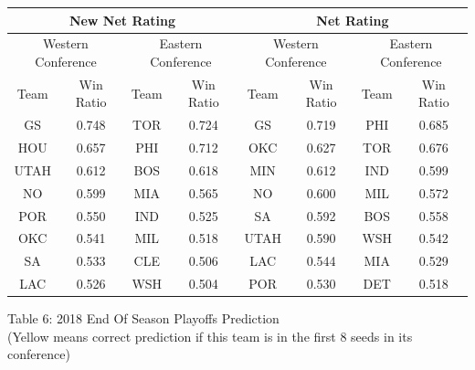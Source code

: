 \documentclass[11pt]{article}
\begin{document}
\begin{center}
\begin{tabular}{|c|c|c|c|c|c|c|c|}
\hline
\multicolumn{4}{|c|}{New Net Rating} &
\multicolumn{4}{c|}{Net Rating} \\
\hline
\multicolumn{2}{|c|}{Western Conference} &
\multicolumn{2}{c|}{Eastern Conference}&
\multicolumn{2}{c|}{Western Conference} &
\multicolumn{2}{c|}{Eastern Conference}\\

\hline
 Team& Win Ratio & Team & Win Ratio & Team & Win Ratio &Team & Win Ratio \\
\hline
\cellcolor{yellow} GS   & 0.748 & \cellcolor{yellow} TOR & 0.724 & \cellcolor{yellow} GS   & 0.719 & \cellcolor{yellow} PHI & 0.685\\
\hline
\cellcolor{yellow} HOU  & 0.657 & \cellcolor{yellow} PHI & 0.712 & \cellcolor{yellow} OKC  & 0.627 & \cellcolor{yellow} TOR & 0.676 \\
\hline
\cellcolor{yellow} UTAH & 0.612 & \cellcolor{yellow} BOS & 0.618 & \cellcolor{yellow} MIN  & 0.612 & \cellcolor{yellow} IND & 0.599\\
\hline
\cellcolor{yellow} NO   & 0.599 & \cellcolor{yellow} MIA & 0.565 & \cellcolor{yellow} NO   & 0.600 & \cellcolor{yellow} MIL & 0.572\\
\hline
\cellcolor{yellow} POR  & 0.550 & \cellcolor{yellow} IND & 0.525 & \cellcolor{yellow} SA   &  0.592 & \cellcolor{yellow} BOS & 0.558 \\
\hline
\cellcolor{yellow} OKC  & 0.541 & \cellcolor{yellow} MIL & 0.518 & \cellcolor{yellow} UTAH & 0.590 & \cellcolor{yellow} WSH & 0.542 \\
\hline
\cellcolor{yellow} SA   & 0.533 & \cellcolor{yellow} CLE & 0.506 & LAC &  0.544 & \cellcolor{yellow} MIA & 0.529\\
\hline
 LAC  & 0.526 & \cellcolor{yellow}  WSH & 0.504 &  \cellcolor{yellow} POR &  0.530 & DET & 0.518\\
\hline
\end{tabular}

\bigskip

Table 6: 2018 End Of Season Playoffs Prediction \\(Yellow means correct prediction if this team is in the first 8 seeds in its conference)
\end{center}
\end{document}
